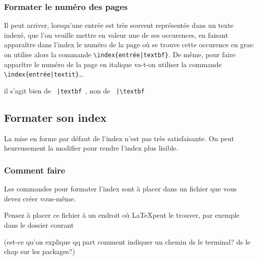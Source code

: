 \subsubsection{Formater le numéro des pages}

Il peut arriver, lorsqu'une entrée est très souvent représentée dans un texte indexé, que l'on veuille mettre en valeur une de ses occurences, en faisant apparaître dans l'index le numéro de la page où se trouve cette occurence en gras: on utilise alors la commande \verb+\index{entrée|textbf}+. De même, pour faire apparître le numéro de la page en italique va-t-on utiliser la commande \verb+\index{entrée|textit}+…

\begin{attention}
il s'agit bien de \verb+ |textbf +, non de \verb+ |\textbf +

\end{attention}




\subsection{Formater son index}

La mise en forme par défaut de l'index n'est pas très satisfaisante. On peut heureusement la modifier pour rendre l'index plus lisible.


\subsubsection{Comment faire}
Les commandes pour formater l'index sont à placer dans un fichier  que vous devez créer vous-même.

\begin{attention}
Pensez à placer ce fichier à un endroit où \LaTeX peut le trouver, par exemple dans le dossier courant 

(est-ce qu'on explique qq part comment indiquer un chemin ds le terminal? ds le chap sur les packages?)
\end{attention}

